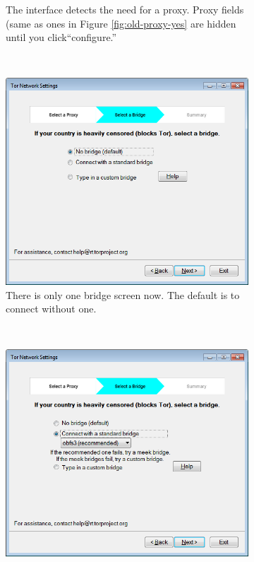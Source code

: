 \documentclass[USenglish,oneside,twocolumn]{article}
\begin{document}
\begin{figure}
\begin{subfigure}[b]{0.30\textwidth}
	\centering\captionsetup{width=1.5\linewidth}%
	\caption{The interface detects the need for a proxy. Proxy fields (same as ones in Figure \ref{fig:old-proxy-yes} are hidden until you click``configure.''}
	\label{fig:new-proxy}
\end{subfigure}
~~~~~~~~~~
\begin{subfigure}[b]{0.30\textwidth}
	\includegraphics[width=\textwidth]{screenshots/NEW-bridgeSettings.png}
	\centering\captionsetup{width=1.5\linewidth}%
	\caption{There is only one bridge screen now. The default is to connect without one.}
	\label{fig:new-nobridge}
\end{subfigure}
~~~~~~~~~~~~~~~~~~~~~~~~~
\begin{subfigure}[b]{0.30\textwidth}
	\includegraphics[width=\textwidth]{screenshots/NEW-bridgeSettings-default.png}

\end{subfigure}
\end{figure}
\end{document}
